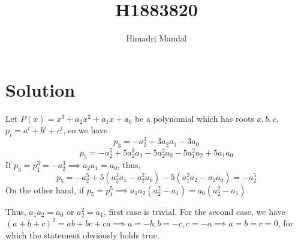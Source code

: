 \documentclass[11pt]{scrartcl}
\title{H1883820}
\author{Himadri Mandal}
\begin{document}
\maketitle

\section{Solution}
\begin{soln}
  \raggedright
  Let $P(x) = x^3 + a_2 x^2 + a_1 x + a_0$ be a polynomial which has roots $a,b,c$. 
  $p_i = a^i + b^i + c^i$, so we have
  \[ p_3 = -a_{2}^3 + 3a_{2}a_{1} - 3a_{0} \]
  \[ p_5 = -a_{2}^5 + 5a_{2}^3 a_{1} - 5a_{2}^2 a_{0} - 5a_{1}^2a_{2} + 5a_{1}a_{0} \]
  If $p_3 = p_1^3 = -a_2^3 \implies a_2 a_1 = a_0$, thus, 
  \[ p_5 = -a_2^5 + 5(a_2^3a_1 -a_2^2a_0) - 5(a_1^2a_2 - a_1a_0) = -a_2^5 \]
  On the other hand, if $p_5 = p_1^5 \implies a_1a_2(a_2^2 - a_1) = a_0(a_2^2 - a_1)$
  
  Thus, $a_1a_2 = a_0$ or $a_2^2 = a_1$, first case is trivial. For the second case, 
  we have $(a+b+c)^2 = ab + bc + ca \implies a = -b, b = -c, c = -a \implies a = b = c = 0$, for
  which the statement obviously holds true.
\end{soln}
\end{document}
